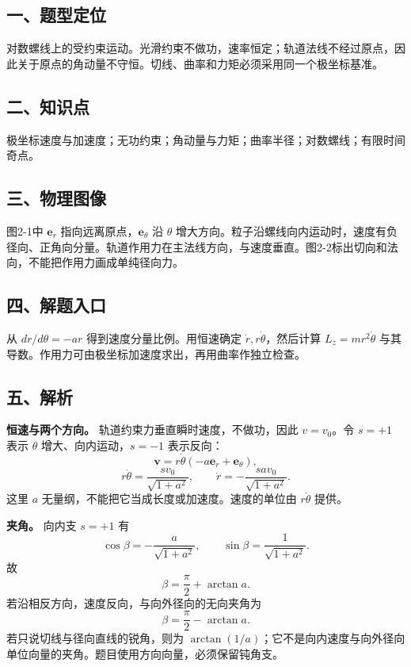 \documentclass[12pt,a4paper,UTF8]{ctexart}
\begin{document}
\subsection{一、题型定位}\label{ux4e00ux9898ux578bux5b9aux4f4d-1}

对数螺线上的受约束运动。光滑约束不做功，速率恒定；轨道法线不经过原点，因此关于原点的角动量不守恒。切线、曲率和力矩必须采用同一个极坐标基准。

\subsection{二、知识点}\label{ux4e8cux77e5ux8bc6ux70b9-1}

极坐标速度与加速度；无功约束；角动量与力矩；曲率半径；对数螺线；有限时间奇点。

\subsection{三、物理图像}\label{ux4e09ux7269ux7406ux56feux50cf-1}

图2-1中 \(\boldsymbol e_r\) 指向远离原点，\(\boldsymbol e_\theta\) 沿
\(\theta\)
增大方向。粒子沿螺线向内运动时，速度有负径向、正角向分量。轨道作用力在主法线方向，与速度垂直。图2-2标出切向和法向，不能把作用力画成单纯径向力。

\subsection{四、解题入口}\label{ux56dbux89e3ux9898ux5165ux53e3-1}

从 \(dr/d\theta=-ar\) 得到速度分量比例。用恒速确定
\(\dot r,r\dot\theta\)，然后计算 \(L_z=mr^2\dot\theta\)
与其导数。作用力可由极坐标加速度求出，再用曲率作独立检查。

\subsection{五、解析}\label{ux4e94ux89e3ux6790-1}

\textbf{恒速与两个方向。} 轨道约束力垂直瞬时速度，不做功，因此
\(v=v_0\)。令 \(s=+1\) 表示 \(\theta\) 增大、向内运动，\(s=-1\)
表示反向： \[
\boldsymbol v=r\dot\theta(-a\boldsymbol e_r+\boldsymbol e_\theta),
\] \[
r\dot\theta=\frac{s v_0}{\sqrt{1+a^2}},\qquad
\dot r=-\frac{s av_0}{\sqrt{1+a^2}}.
\] 这里 \(a\) 无量纲，不能把它当成长度或加速度。速度的单位由
\(r\dot\theta\) 提供。

\textbf{夹角。} 向内支 \(s=+1\) 有 \[
\cos\beta=-\frac a{\sqrt{1+a^2}},\qquad
\sin\beta=\frac1{\sqrt{1+a^2}}.
\] 故 \[
\boxed{\beta=\frac\pi2+\arctan a}.
\] 若沿相反方向，速度反向，与向外径向的无向夹角为 \[
\boxed{\beta=\frac\pi2-\arctan a}.
\] 若只说切线与径向直线的锐角，则为
\(\arctan(1/a)\)；它不是向内速度与向外径向单位向量的夹角。题目使用方向向量，必须保留钝角支。
\end{document}

